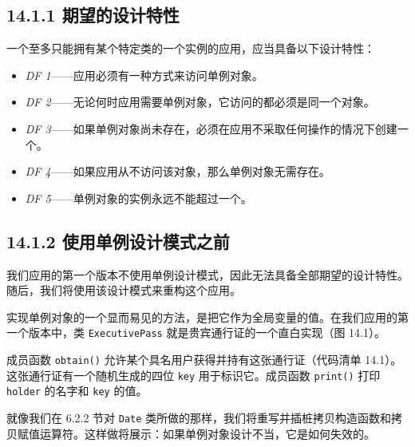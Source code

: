 \subsection{14.1.1 期望的设计特性}

一个至多只能拥有某个特定类的一个实例的应用，应当具备以下设计特性：

\begin{itemize}
\item \emph{DF 1}——应用必须有一种方式来访问单例对象。
\item \emph{DF 2}——无论何时应用需要单例对象，它访问的都必须是同一个对象。
\item \emph{DF 3}——如果单例对象尚未存在，必须在应用不采取任何操作的情况下创建一个。
\item \emph{DF 4}——如果应用从不访问该对象，那么单例对象无需存在。
\item \emph{DF 5}——单例对象的实例永远不能超过一个。
\end{itemize}

\subsection{14.1.2 使用单例设计模式之前}

我们应用的第一个版本不使用单例设计模式，因此无法具备全部期望的设计特性。随后，我们将使用该设计模式来重构这个应用。

实现单例对象的一个显而易见的方法，是把它作为全局变量的值。在我们应用的第一个版本中，类 \texttt{Executive\allowbreak{}Pass} 就是贵宾通行证的一个直白实现（图 14.1）。


成员函数 \texttt{obtain()} 允许某个具名用户获得并持有这张通行证（代码清单 14.1）。这张通行证有一个随机生成的四位 \texttt{key} 用于标识它。成员函数 \texttt{print()} 打印 \texttt{holder} 的名字和 \texttt{key} 的值。

就像我们在 6.2.2 节对 \texttt{Date} 类所做的那样，我们将重写并插桩拷贝构造函数和拷贝赋值运算符。这样做将展示：如果单例对象设计不当，它是如何失效的。


